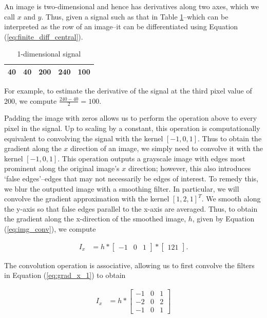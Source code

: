 An image is two-dimensional and hence has derivatives along two axes, which
we call $x$ and $y$.
Thus, given a signal such as that in Table \ref{table:1dSignal}--which can be
interpreted as the row of an image--it can be differentiated using Equation
(\ref{eq:finite_diff_central}). 

\begin{table}
\centering
\begin{tabular}{|c|c|c|c|c|}
\hline 
40 & 40 & 200 & 240 & 100 \\
\hline
\end{tabular}
\caption{1-dimensional signal}
\label{table:1dSignal}
\end{table}

For example, to estimate the derivative
of the signal at the third pixel value of 200, we compute
$\frac{240-40}{2} = 100$. 

Padding the image with zeros allows us to perform the operation above to
every pixel in the signal. Up to scaling by a constant, this operation is computationally equivalent to convolving the signal with the
kernel $[-1, 0, 1]$. Thus to obtain the gradient along the $x$ direction
of an image, we simply need to convolve it with the kernel $[-1, 0 ,1]$. 
This operation outputs a grayscale image with edges most prominent along
the original image's $x$ direction; however, this also introduces `false 
edges'--edges that may not necessarily be edges of interest. To remedy
this, we blur the outputted image with a smoothing filter. In particular,
we will convolve the gradient approximation with the kernel 
$[1, 2, 1]^T$. We smooth along the y-axis so that false edges parallel
to the x-axis are averaged. Thus, to obtain the gradient along the
x-direction of the smoothed image, $h$, given by Equation (\ref{eq:img_conv}), we 
compute

\begin{align}\label{eq:grad_x_1}
I_x &= h * 
\begin{bmatrix}
-1 & 0 & 1
\end{bmatrix} *
\begin{bmatrix}
1  2  1
\end{bmatrix}.
\end{align}

The convolution operation is associative, allowing us to first convolve
the filters in Equation (\ref{eq:grad_x_1}) to obtain

\begin{align}\label{eq:grad_x_2}
I_x &= h * 
\begin{bmatrix}
-1 & 0 & 1 \\
-2 & 0 & 2 \\
-1 & 0 & 1
\end{bmatrix}
\end{align}

